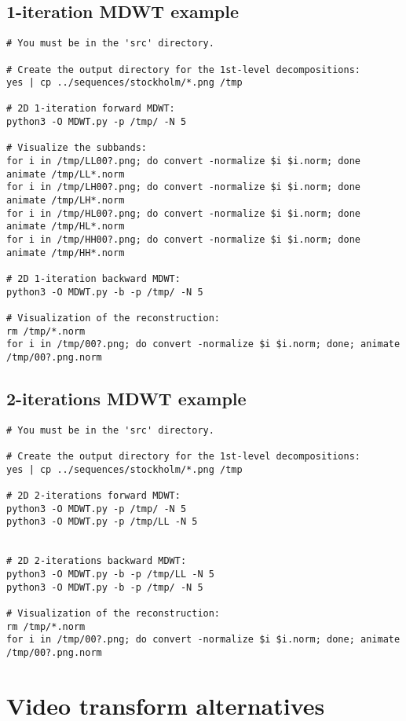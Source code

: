 \subsection{1-iteration MDWT example}
\begin{verbatim}
# You must be in the 'src' directory.

# Create the output directory for the 1st-level decompositions:
yes | cp ../sequences/stockholm/*.png /tmp

# 2D 1-iteration forward MDWT:
python3 -O MDWT.py -p /tmp/ -N 5

# Visualize the subbands:
for i in /tmp/LL00?.png; do convert -normalize $i $i.norm; done
animate /tmp/LL*.norm
for i in /tmp/LH00?.png; do convert -normalize $i $i.norm; done
animate /tmp/LH*.norm
for i in /tmp/HL00?.png; do convert -normalize $i $i.norm; done
animate /tmp/HL*.norm
for i in /tmp/HH00?.png; do convert -normalize $i $i.norm; done
animate /tmp/HH*.norm

# 2D 1-iteration backward MDWT:
python3 -O MDWT.py -b -p /tmp/ -N 5

# Visualization of the reconstruction:
rm /tmp/*.norm
for i in /tmp/00?.png; do convert -normalize $i $i.norm; done; animate /tmp/00?.png.norm
\end{verbatim}

\subsection{2-iterations MDWT example}
\begin{verbatim}
# You must be in the 'src' directory.

# Create the output directory for the 1st-level decompositions:
yes | cp ../sequences/stockholm/*.png /tmp

# 2D 2-iterations forward MDWT:
python3 -O MDWT.py -p /tmp/ -N 5
python3 -O MDWT.py -p /tmp/LL -N 5


# 2D 2-iterations backward MDWT:
python3 -O MDWT.py -b -p /tmp/LL -N 5
python3 -O MDWT.py -b -p /tmp/ -N 5

# Visualization of the reconstruction:
rm /tmp/*.norm
for i in /tmp/00?.png; do convert -normalize $i $i.norm; done; animate /tmp/00?.png.norm
\end{verbatim}


\section{Video transform alternatives}

